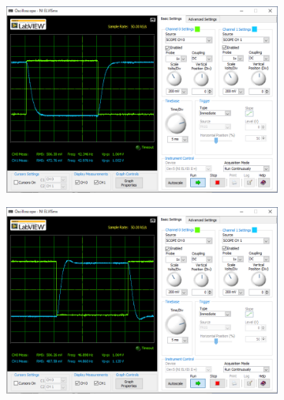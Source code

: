 \begin{figure}
	\centering
	\begin{subfigure}{0.8\linewidth}
		\centering
		\includegraphics[width=0.8\linewidth]{src/figures/exp10/5k-low-sq.png}
	\end{subfigure}
	\begin{subfigure}{0.8\linewidth}
		\centering
		\includegraphics[width=0.8\linewidth]{src/figures/exp10/7k-low-sq.png}
	\end{subfigure}
\end{figure}
